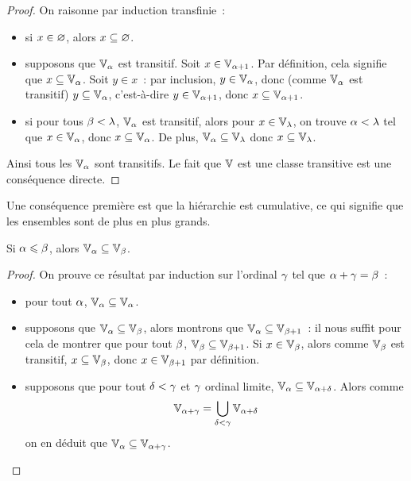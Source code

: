\begin{proof}
  On raisonne par induction transfinie~:
  \begin{itemize}
  \item si $x\in \varnothing$, alors $x\subseteq\varnothing$.
  \item supposons que $\mathbb V_{\alpha}$ est transitif. Soit $x\in\mathbb V_{\alpha+1}$. Par
    définition, cela signifie que $x\subseteq \mathbb V_{\alpha}$. Soit $y\in x$~: par
    inclusion, $y\in \mathbb V_{\alpha}$, donc (comme $\mathbb V_{\alpha}$ est transitif) $y\subseteq \mathbb V_{\alpha}$,
    c'est-à-dire $y\in \mathbb V_{\alpha + 1}$, donc $x\subseteq \mathbb V_{\alpha + 1}$.
  \item si pour tous $\beta < \lambda$, $\mathbb V_{\alpha}$ est transitif, alors
    pour $x\in \mathbb V_\lambda$, on trouve $\alpha < \lambda$ tel que $x\in \mathbb V_{\alpha}$,
    donc $x\subseteq \mathbb V_{\alpha}$. De plus, $\mathbb V_{\alpha} \subseteq \mathbb V_\lambda$ donc
    $x\subseteq \mathbb V_\lambda$.
  \end{itemize}
  Ainsi tous les $\mathbb V_{\alpha}$ sont transitifs. Le fait que $\mathbb V$ est une classe
  transitive est une conséquence directe.
\end{proof}

Une conséquence première est que la hiérarchie est cumulative, ce qui signifie
que les ensembles sont de plus en plus grands.

\begin{property}
  Si $\alpha \leqslant \beta$, alors $\mathbb V_{\alpha}\subseteq \mathbb V_\beta$.
\end{property}

\begin{proof}
  On prouve ce résultat par induction sur l'ordinal $\gamma$ tel que
  $\alpha + \gamma = \beta$~:
  \begin{itemize}
  \item pour tout $\alpha$, $\mathbb V_{\alpha} \subseteq \mathbb V_\alpha$.
  \item supposons que $\mathbb V_{\alpha} \subseteq \mathbb V_\beta$, alors montrons que
    $\mathbb V_{\alpha} \subseteq \mathbb V_{\beta+1}$~: il nous suffit pour cela de montrer que
    pour tout $\beta$, $\mathbb V_\beta\subseteq\mathbb V_{\beta+1}$. Si $x\in\mathbb V_\beta$,
    alors comme $\mathbb V_\beta$ est transitif, $x\subseteq \mathbb V_\beta$, donc
    $x\in \mathbb V_{\beta + 1}$ par définition.
  \item supposons que pour tout $\delta < \gamma$ et $\gamma$ ordinal limite,
    $\mathbb V_{\alpha} \subseteq \mathbb V_{\alpha + \delta}$. Alors
    comme
    \[\mathbb V_{\alpha + \gamma} =
    \bigcup_{\delta < \gamma} \mathbb V_{\alpha + \delta}\]
    on en déduit que $\mathbb V_{\alpha} \subseteq \mathbb V_{\alpha + \gamma}$.\qedhere
  \end{itemize}
\end{proof}

